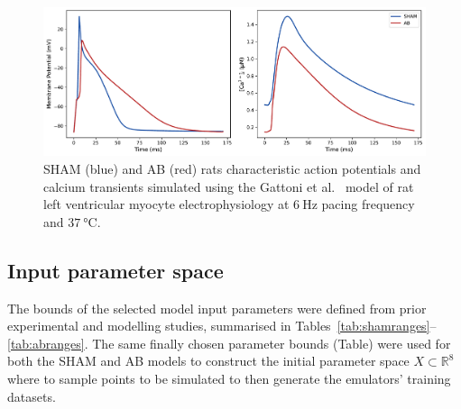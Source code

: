 \begin{figure}[!ht]
    \myfloatalign
    \includegraphics[width=\textwidth]{figures/chapter02/sham_vs_ab_ca_ap.pdf}
    \caption{SHAM (blue) and AB (red) rats characteristic action potentials and calcium transients simulated using the Gattoni et al.~\cite{Gattoni:2017} model of rat left ventricular myocyte electrophysiology at $\SI{6}{\hertz}$ pacing frequency and $\SI{37}{\celsius}$.}
    \label{fig:shamvsabcaap}
\end{figure}


%
%
%
\subsection{Input parameter space}
The bounds of the selected model input parameters were defined from prior experimental and modelling studies, summarised in Tables~\ref{tab:shamranges}--\ref{tab:abranges}. The same finally chosen parameter bounds (Table) were used for both the SHAM and AB models to construct the initial parameter space $X\subset\mathbb{R}^{8}$ where to sample points to be simulated to then generate the emulators' training datasets. 

